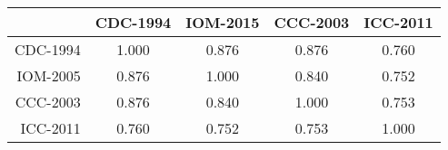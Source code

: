 \begin{tabular}{r|cccc}
 & CDC-1994 & IOM-2015 & CCC-2003 & ICC-2011 \\ 
\hline
CDC-1994 & 1.000 & 0.876 & 0.876 & 0.760 \\
IOM-2005 & 0.876 & 1.000 & 0.840 & 0.752 \\
CCC-2003 & 0.876 & 0.840 & 1.000 & 0.753 \\
ICC-2011 & 0.760 & 0.752 & 0.753 & 1.000 
\end{tabular}